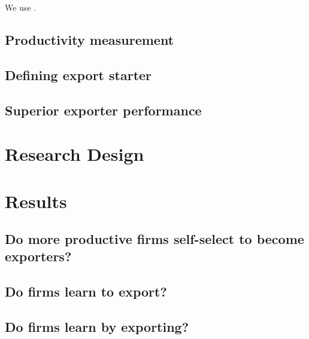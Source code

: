 \documentclass[11pt]{article}
\begin{document}
We use \cite{aw2011}.

\subsection{Productivity measurement}


\subsection{Defining export starter}\label{subsec:starter}


\subsection{Superior exporter performance}


\section{Research Design}\label{sec:design}


\section{Results}\label{sec:methodology}

\subsection{Do more productive firms self-select to become
  exporters?}\label{subsec:selfselect}


\subsection{Do firms learn to export?}


\subsection{Do firms learn by exporting?}




\end{document}
